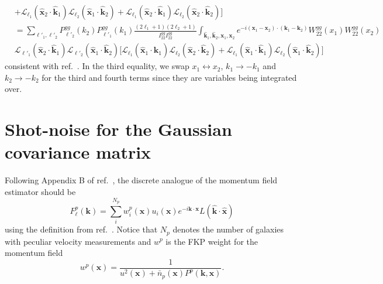 \documentclass[a4paper,11pt]{article}
\begin{document}
\begin{align}
    &+ \mathcal{L}_{\ell_1}(\hat{\boldsymbol{x}}_2 \cdot \hat{\boldsymbol{k}}_1)\mathcal{L}_{\ell_2}(\hat{\boldsymbol{x}}_1 \cdot \hat{\boldsymbol{k}}_2) + \mathcal{L}_{\ell_1}(\hat{\boldsymbol{x}}_2 \cdot \hat{\boldsymbol{k}}_1)\mathcal{L}_{\ell_2}(\hat{\boldsymbol{x}}_2 \cdot \hat{\boldsymbol{k}}_2)\Big] \nonumber \\
    &=\sum_{\ell'_1, \ell'_2} P^{gg}_{\ell'_2}(k_2) P^{gg}_{\ell'_1}(k_1)\frac{(2\ell_1 + 1)(2\ell_2 + 1)}{I_{22}^{gg} I_{22}^{gg}} \int_{\hat{\mathbf{k}}_1, \hat{\mathbf{k}}_2, \mathbf{x}_1, \mathbf{x}_2} e^{-i(\mathbf{x}_1 - \mathbf{x}_2) \cdot (\mathbf{k}_1 - \mathbf{k}_2)}W_{22}^{gg}(x_1)W_{22}^{gg}(x_2) \nonumber \\
    &\mathcal{L}_{\ell'_1}(\hat{\mathbf{x}}_2 \cdot \hat{\mathbf{k}}_1)\mathcal{L}_{\ell'_2}(\hat{\mathbf{x}}_1 \cdot \hat{\mathbf{k}}_2)\Big[\mathcal{L}_{\ell_1}(\hat{\boldsymbol{x}}_1 \cdot \hat{\boldsymbol{k}}_1)\mathcal{L}_{\ell_2}(\hat{\boldsymbol{x}}_2 \cdot \hat{\boldsymbol{k}}_2) + \mathcal{L}_{\ell_1}(\hat{\boldsymbol{x}}_1 \cdot \hat{\boldsymbol{k}}_1)\mathcal{L}_{\ell_2}(\hat{\boldsymbol{x}}_1 \cdot \hat{\boldsymbol{k}}_2)\Big]
\end{align}
consistent with ref.~\citep{Wadekar_2020}. In the third equality, we swap \(x_1 \leftrightarrow x_2\), \(k_1 \rightarrow -k_1\) and \(k_2 \rightarrow -k_2\) for the third and fourth terms since they are variables being integrated over. 

\section{Shot-noise for the Gaussian covariance matrix}
Following Appendix B of ref.~\citep{Wadekar_2020}, the discrete analogue of the momentum field estimator should be 
\begin{equation}
    F_\ell^p(\boldsymbol{k}) = \sum_i^{N_p} w_i^p(\boldsymbol{x})u_i(\boldsymbol{x})e^{-i\boldsymbol{k}\cdot\boldsymbol{x}} L(\hat{\boldsymbol{k}} \cdot \hat{\boldsymbol{x}})
\end{equation}
using the definition from ref.~\citep{Howlett_2019}. Notice that \(N_p\) denotes the number of galaxies with peculiar velocity measurements and \(w^p\) is the FKP weight for the momentum field \citep{Howlett_2019}
\begin{equation}
    w^p(\boldsymbol{x}) = \frac{1}{u^2(\boldsymbol{x}) + \bar{n}_p(\boldsymbol{x})P^p(\boldsymbol{k}, \boldsymbol{x})}.
\end{equation}
\end{document}
